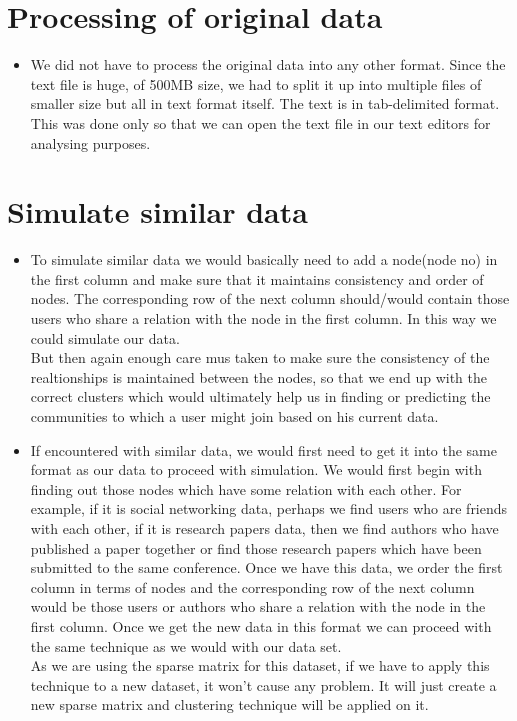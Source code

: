 \documentclass[11pt]{exam}
\begin{document}
\section{Processing of original data}

\begin{itemize}

\item[] We did not have to process the original data into any other format. Since the text file is huge, of 500MB size, we had to split it up into multiple files of smaller size but all in text format itself. The text is in tab-delimited format. This was done only so that we can open the text file in our text editors for analysing purposes. 

\end{itemize}

\section{Simulate similar data}

\begin{itemize}


\item[] To simulate similar data we would basically need to add a node(node no) in the first column and make sure that it maintains consistency and order of nodes. The corresponding row of the next column should/would contain those users who share a relation with the node in the first column. In this way we could simulate our data. \\

But then again enough care mus taken to make sure the consistency of the realtionships is maintained between the nodes, so that we end up with the correct clusters which would ultimately help us in finding or predicting the communities to which a user might join based on his current data.


\item[] If encountered with similar data, we would first need to get it into the same format as our data to proceed with simulation. We would first begin with finding out those nodes which have some relation with each other. For example, if it is social networking data, perhaps we find users who are friends with each other, if it is research papers data, then we find authors who have published a paper together or find those research papers which have been submitted to the same conference. Once we have this data, we order the first column in terms of nodes and the corresponding row of the next column would be those users or authors who share a relation with the node in the first column. Once we get the new data in this format we can proceed with the same technique as we would with our data set.\\
As we are using the sparse matrix for this dataset, if we have to apply this technique to a new dataset, it won't cause any problem.  It will just create a new sparse matrix and clustering technique will be applied on it.

\end{itemize}
\end{document}
